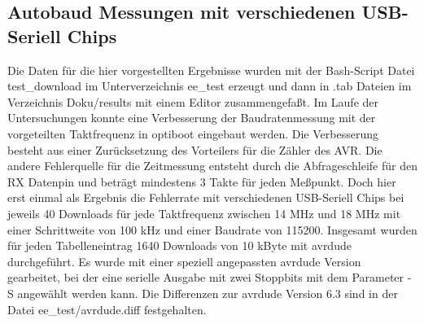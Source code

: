 \subsection{Autobaud Messungen mit verschiedenen USB-Seriell Chips}

Die Daten für die hier vorgestellten Ergebnisse wurden mit der Bash-Script Datei test\_download
im Unterverzeichnis ee\_test erzeugt und dann in .tab Dateien im Verzeichnis Doku/results 
mit einem Editor zusammengefaßt.
Im Laufe der Untersuchungen konnte eine Verbesserung der Baudratenmessung mit der vorgeteilten
Taktfrequenz in optiboot eingebaut werden. Die Verbesserung besteht aus einer Zurücksetzung des
Vorteilers für die Zähler des AVR. Die andere Fehlerquelle für die Zeitmessung entsteht durch
die Abfrageschleife für den RX Datenpin und beträgt mindestens 3 Takte für jeden Meßpunkt.
Doch hier erst einmal als Ergebnis die Fehlerrate mit verschiedenen USB-Seriell Chips
bei jeweils 40 Downloads für jede Taktfrequenz zwischen 14 MHz und 18 MHz mit einer
Schrittweite von 100 kHz und einer Baudrate von 115200.
Insgesamt wurden für jeden Tabelleneintrag 1640 Downloads von 10 kByte mit 
avrdude durchgeführt.
Es wurde mit einer speziell angepassten avrdude Version gearbeitet,
bei der eine serielle Ausgabe mit zwei Stoppbits mit dem Parameter -S angewählt werden kann.
Die Differenzen zur avrdude Version 6.3 sind in der Datei ee\_test/avrdude.diff festgehalten.


